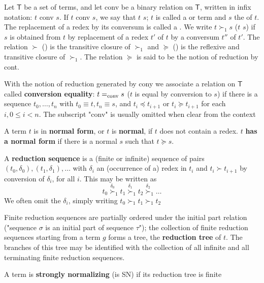 \documentclass[11pt]{article}
\begin{document}
\begin{definition}
Let \(\mathsf{T}\) be a set of terms, and let conv be a binary relation on
\(\mathsf{T}\), written in infix notation: \(t\) conv \(s\). If \(t\) conv \(s\), we
say that \(t\)  \(s\); \(t\) is called a  or
 term and \(s\) the  of \(t\). The replacement of a
redex by its conversum is called a . We write \(t\succ_1 s\)
(\(t\)  \(s\)) if \(s\) is obtained from \(t\) by
replacement of a redex \(t'\) of \(t\) by a conversum \(t''\) of \(t'\). The relation
\(\succ\) () is the transitive closure of \(\succ_1\) and
\(\succeq\) () is the reflexive and transitive closure of
\(\succ_1\). The relation \(\succeq\) is said to be the notion of reduction
 by cont.

With the notion of reduction generated by cony we associate a relation on
\(\mathsf{T}\) called \textbf{conversion equality}: \(t=_{\text{conv}}s\) (\(t\) is equal by
conversion to \(s\)) if there 
is a sequence \(t_0,\dots,t_n\) with \(t_0\equiv t,t_n\equiv s\), and \(t_i\preceq
   t_{i+1}\) or \(t_i\succeq t_{i+1}\) for each
\(i, 0\le i < n\). The subscript "conv" is usually omitted when clear from the
context

A term \(t\) is in \textbf{normal form}, or \(t\) is \textbf{normal}, if \(t\) does not contain a redex. \(t\)
\textbf{has a normal form} if there is a normal \(s\) such that \(t\succeq s\).

A \textbf{reduction sequence} is a (finite or infinite) sequence of pairs
\((t_0,\delta_0),(t_1,\delta_1),\dots\) 
with \(\delta_i\) an (occurrence of a) redex in \(t_i\) and \(t_i\succ t_{i+1}\) by
conversion 
of \(\delta_i\), for all \(i\). This may be written as
\begin{equation*}
t_0\overset{\delta_0}{\succ}_1 t_1\overset{\delta_1}{\succ}_1 t_2
\overset{\delta_2}{\succ}_1\dots
\end{equation*}
We often omit the \(\delta_i\), simply writing \(t_0\succ_1 t_1\succ_1 t_2\)

Finite reduction sequences are partially ordered under the initial part
relation ("sequence \(\sigma\) is an initial part of sequence \(\tau\)"); the collection of
finite 
reduction sequences starting from a term \(g\) forms a tree, the \textbf{reduction tree}
of \(t\). The branches of this tree may be identified with the collection of all
infinite and all terminating finite reduction sequences.


A term is \textbf{strongly normalizing} (is SN) if its reduction tree is finite
\end{definition}
\end{document}
